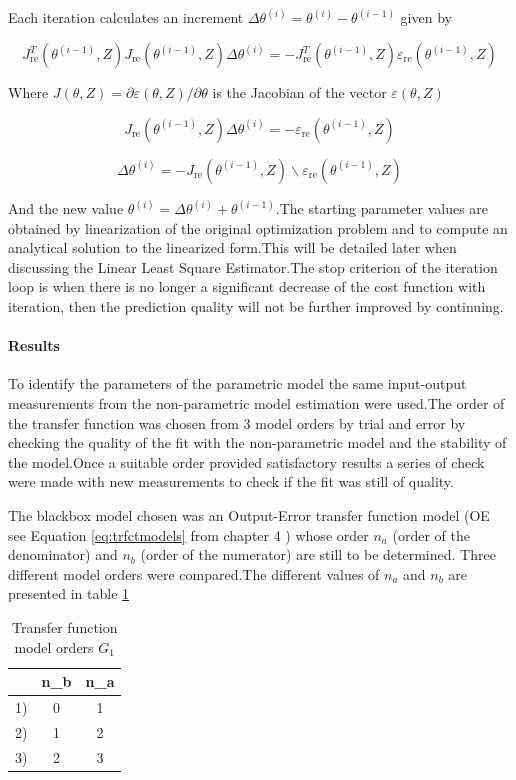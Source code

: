 \documentclass[a4paper,12pt]{article}
\numberwithin{equation}{section}
\begin{document}
Each iteration calculates an increment $\Delta \theta^{(i)}=\theta^{(i)}-\theta^{(i-1)}$ given by 

$$
J_{\mathrm{re}}^{T}\left(\theta^{(i-1)}, Z\right) J_{\mathrm{re}}\left(\theta^{(i-1)}, Z\right) \Delta \theta^{(i)}=-J_{\mathrm{re}}^{T}\left(\theta^{(i-1)}, Z\right) \varepsilon_{\mathrm{re}}\left(\theta^{(i-1)}, Z\right)
$$

Where $J(\theta, Z)=\partial \varepsilon(\theta, Z) / \partial \theta$ is the Jacobian of the vector $\varepsilon(\theta, Z)$

$$
J_{\mathrm{re}}\left(\theta^{(i-1)}, Z\right) \Delta \theta^{(i)}=-\varepsilon_{\mathrm{re}}\left(\theta^{(i-1)}, Z\right)
$$

$$
\Delta \theta^{(i)}=-J_{\mathrm{re}}\left(\theta^{(i-1)}, Z\right) \backslash \varepsilon_{\mathrm{re}}\left(\theta^{(i-1)}, Z\right)
$$

\noindent
And the new value $\theta^{(i)}=\Delta \theta^{(i)} + \theta^{(i-1)} $.The starting parameter values are obtained by linearization of the original optimization problem and to compute an analytical solution to the linearized form.This will be detailed later when discussing the Linear Least Square Estimator.The stop criterion of the iteration loop is when there is no longer a significant decrease of the cost function with iteration, then the prediction quality will not be further improved by continuing.

\paragraph{Results}
To identify the parameters of the parametric model the same input-output measurements from the non-parametric model estimation were used.The order of the transfer function was chosen from 3 model orders by trial and error by checking the quality of the fit with the non-parametric model and the stability of the model.Once a suitable order provided satisfactory results a series of check were made with new measurements to check if the fit was still of quality.

The blackbox model chosen was an Output-Error transfer function model (OE see Equation \ref{eq:trfctmodels} from chapter 4 ) whose order $n_{a}$ (order of the denominator)  and $n_{b}$
 (order of the numerator) are still to be determined. Three different model orders
were compared.The different values of  $n_{a}$ and $n_{b}$ are  presented
in table \ref{table:model order}


\begin{table}[H]
\centering
\begin{tabular}{|c|c|c|}
\hline  & n_{b} & n_{a} \\
\hline 1) & 0 & 1  \\
\hline 2) & 1 & 2  \\
\hline 3) & 2 & 3  \\
\hline
\end{tabular}
\caption{Transfer function model orders $G_{1}$}
\label{table:model order}
\end{table}
\end{document}
